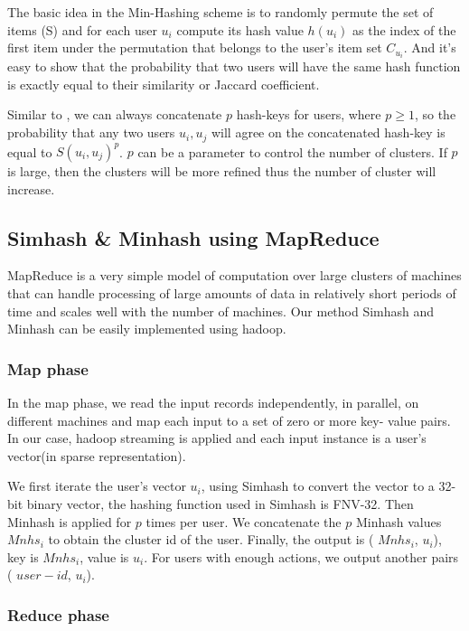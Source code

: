 The basic idea in the Min-Hashing scheme is to randomly permute the set of items (S) and for each user $u_i$ compute its hash value $h(u_i)$ as the index of the first item under the permutation that belongs to the user’s item set $C_{u_i}$. And it's easy to show that the probability that two users will have the same hash function is exactly equal to their similarity or Jaccard coefficient.

Similar to \cite{Indyk:1998:ANN:276698.276876}, we can always concatenate $p$ hash-keys for
users, where $p \ge 1$, so the probability that any two users $u_i , u_j$ will agree on the concatenated hash-key is equal to $S(u_i , u_j )^p$. $p$ can be a parameter to control the number of clusters. If $p$ is large, then the clusters will be more refined thus the number of cluster will increase.

\subsection{Simhash \& Minhash using MapReduce}

MapReduce is a very simple model of computation over large clusters of machines that can handle processing of large amounts of data in relatively short periods of time and scales well with the number of machines. Our method Simhash and Minhash can be easily implemented using hadoop.

\subsubsection{Map phase}
In the map phase, we read the input records independently, in parallel, on different machines and map each input to a set of zero or more key-
value pairs. In our case, hadoop streaming is applied and each input instance is a user's vector(in sparse representation).

We first iterate the user's vector $u_i$, using Simhash to convert the vector to a 32-bit binary vector, the hashing function used in Simhash is FNV-32. Then Minhash is applied for $p$ times per user. We concatenate the $p$ Minhash values $Mnhs_i$ to obtain the cluster id of the user. Finally, the output is ( $Mnhs_i$, $u_i$), key is $Mnhs_i$, value is $u_i$. For users with enough actions, we output another pairs ( $user-id$, $u_i$). 

\subsubsection{Reduce phase}

